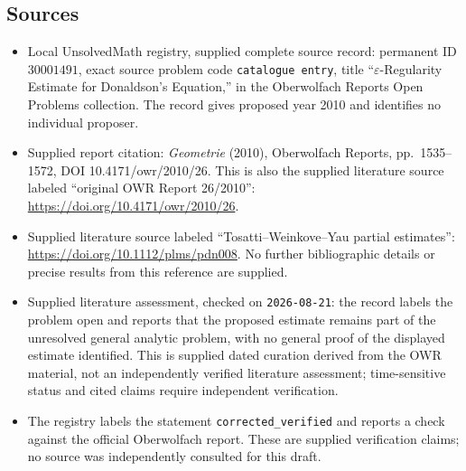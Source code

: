\documentclass[11pt]{article}
\begin{document}
\subsection{Sources}
\begin{itemize}
\item Local UnsolvedMath registry, supplied complete source record: permanent ID \(30001491\), exact source problem code \texttt{catalogue entry}, title ``\(\varepsilon\)-Regularity Estimate for Donaldson's Equation,'' in the Oberwolfach Reports Open Problems collection. The record gives proposed year 2010 and identifies no individual proposer.
\item Supplied report citation: \emph{Geometrie} (2010), Oberwolfach Reports, pp.\ 1535--1572, DOI 10.4171/owr/2010/26. This is also the supplied literature source labeled ``original OWR Report 26/2010'': \url{https://doi.org/10.4171/owr/2010/26}.
\item Supplied literature source labeled ``Tosatti--Weinkove--Yau partial estimates'': \url{https://doi.org/10.1112/plms/pdn008}. No further bibliographic details or precise results from this reference are supplied.
\item Supplied literature assessment, checked on \texttt{2026-08-21}: the record labels the problem open and reports that the proposed estimate remains part of the unresolved general analytic problem, with no general proof of the displayed estimate identified. This is supplied dated curation derived from the OWR material, not an independently verified literature assessment; time-sensitive status and cited claims require independent verification.
\item The registry labels the statement \texttt{corrected\_verified} and reports a check against the official Oberwolfach report. These are supplied verification claims; no source was independently consulted for this draft.
\end{itemize}
\end{document}
